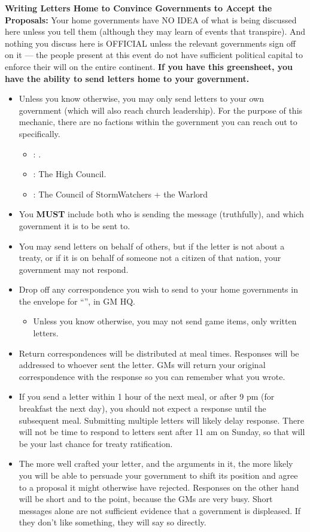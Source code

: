 \documentclass[green]{GL2020}
\begin{document}
\textbf{Writing Letters Home to Convince Governments to Accept the Proposals:}
Your home governments have NO IDEA of what is being discussed here unless you tell them (although they may learn of events that transpire). And nothing you discuss here is OFFICIAL unless the relevant governments sign off on it — the people present at this event do not have sufficient political capital to enforce their will on the entire continent. \textbf{If you have this greensheet, you have the ability to send letters home to your government.}
\begin{itemize}
  \item Unless you know otherwise, you may only send letters to your own government (which will also reach church leadership). For the purpose of this mechanic, there are no factions within the government you can reach out to specifically.
  \begin{itemize}
    \item \pFarm{}: \cQueen{\full}.
    \item \pTech{}: The High Council.
    \item \pShip{}: The Council of StormWatchers + the Warlord
  \end{itemize}
  \item You \textbf{MUST} include both who is sending the message (truthfully), and which government it is to be sent to.
  \item You may send letters on behalf of others, but if the letter is not about a treaty, or if it is on behalf of someone not a citizen of that nation, your government may not respond.
  \item Drop off any correspondence you wish to send to your home governments in the envelope for “\sSignT{}”, in GM HQ.
  \begin{itemize}
    \item Unless you know otherwise, you may not send game items, only written letters.
  \end{itemize}
  \item Return correspondences will be distributed at meal times. Responses will be addressed to whoever sent the letter. GMs will return your original correspondence with the response so you can remember what you wrote.
  \item If you send a letter within 1 hour of the next meal, or after 9 pm (for breakfast the next day), you should not expect a response until the subsequent meal. Submitting multiple letters will likely delay response. There will not be time to respond to letters sent after 11 am on Sunday, so that will be your last chance for treaty ratification.
  \item The more well crafted your letter, and the arguments in it, the more likely you will be able to persuade your government to shift its position and agree to a proposal it might otherwise have rejected. Responses on the other hand will be short and to the point, because the GMs are very busy. Short messages alone are not sufficient evidence that a government is displeased. If they don’t like something, they will say so directly.
\end{itemize}
\end{document}
